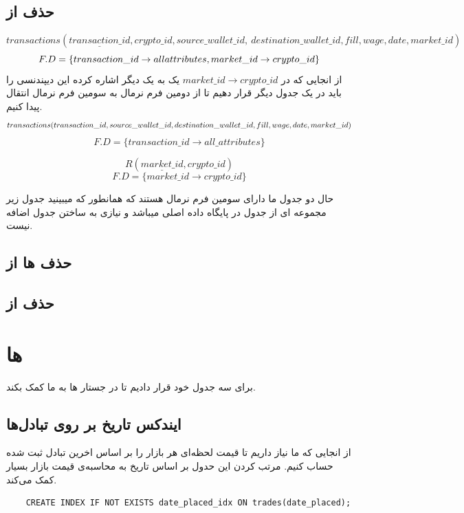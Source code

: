 \documentclass{book}
\begin{document}
\subsection{حذف  از }
$$transactions(\underline{transaction\_id}, crypto\_id, source\_wallet\_id,\
    destination\_wallet\_id, fill, wage, date,market\_id)$$
$$F.D = \{transaction\_id \rightarrow all\space attributes , market\_id \rightarrow crypto\_id\}$$
از انجایی که در $market\_id \rightarrow crypto\_id$ یک  به یک \lr{non prime attribute} دیگر اشاره کرده این دیپندنسی را باید در یک جدول دیگر قرار دهیم تا از دومین فرم نرمال به سومین فرم نرمال انتقال پیدا کنیم.
$$transactions(transaction\_id, source\_wallet\_id,\newline
    destination\_wallet\_id, fill, wage, date,market\_id)$$
$$F.D = \{transaction\_id \rightarrow all\_attributes \}$$

$$R(\underline{market\_id}, crypto\_id)$$
$$F.D = \{market\_id \rightarrow crypto\_id\}$$

حال دو جدول ما دارای سومین فرم نرمال هستند که همانطور که میبینید جدول  زیر مجموعه ای از جدول  در پایگاه داده اصلی میباشد و نیازی به ساختن جدول اضافه نیست.


\subsection{حذف  ها از }
\subsection{حذف  از }
\section{ها}
برای سه جدول خود  قرار دادیم تا در جستار ها به ما کمک بکند.
\subsection{ایندکس تاریخ بر روی تبادل‌ها}
از انجایی که ما نیاز داریم تا قیمت لحظه‌ای هر بازار را بر اساس اخرین تبادل ثبت شده حساب کنیم. مرتب کردن این حدول بر اساس تاریخ به محاسبه‌ی قیمت بازار بسیار کمک می‌کند.

\begin{latin}
    \begin{verbatim}
    CREATE INDEX IF NOT EXISTS date_placed_idx ON trades(date_placed);
    \end{verbatim}
\end{latin}
\end{document}
